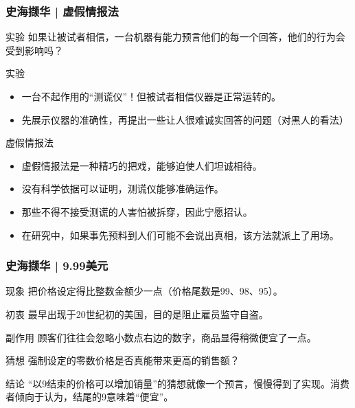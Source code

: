 \begin{frame}
  \frametitle{史海撷华 | 虚假情报法}
  \begin{block}{实验}
    如果让被试者相信，一台机器有能力预言他们的每一个回答，他们的行为会受到影响吗？
  \end{block}
  \vspace{-0.5em}
  \pause
  \begin{block}{实验}
    \begin{itemize}
      \item 一台不起作用的“测谎仪”！但被试者相信仪器是正常运转的。
      \item 先展示仪器的准确性，再提出一些让人很难诚实回答的问题（对黑人的看法）
    \end{itemize}
  \end{block}
  \vspace{-0.5em}
  \pause
  \begin{block}{虚假情报法}
    \begin{itemize}
      \item 虚假情报法是一种精巧的把戏，能够迫使人们坦诚相待。
      \item 没有科学依据可以证明，测谎仪能够准确运作。
      \item 那些不得不接受测谎的人害怕被拆穿，因此宁愿招认。
      \item 在研究中，如果事先预料到人们可能不会说出真相，该方法就派上了用场。
    \end{itemize}
  \end{block}
\end{frame}

\begin{frame}
  \frametitle{史海撷华 | 9.99美元}
  \begin{block}{现象}
    把价格设定得比整数金额少一点（价格尾数是99、98、95）。
  \end{block}
  \pause
  \begin{block}{初衷}
    最早出现于20世纪初的美国，目的是阻止雇员监守自盗。
  \end{block}
  \pause
  \begin{block}{副作用}
    顾客们往往会忽略小数点右边的数字，商品显得稍微便宜了一点。
  \end{block}
  \pause
  \begin{block}{猜想}
    强制设定的零数价格是否真能带来更高的销售额？
  \end{block}
  \pause
  \begin{block}{结论}
    “以9结束的价格可以增加销量”的猜想就像一个预言，慢慢得到了实现。消费者倾向于认为，结尾的9意味着“便宜”。
  \end{block}
\end{frame}

